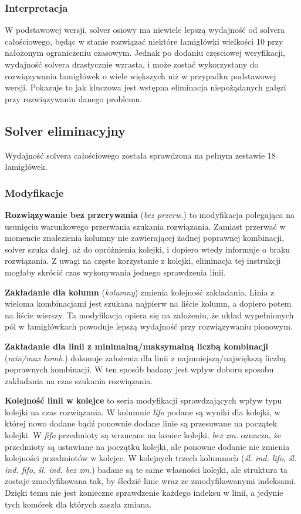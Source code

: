 \subsubsection{Interpretacja}
    W podstawowej wersji, solver osiowy ma niewiele lepszą wydajność od solvera całościowego,
będąc w stanie rozwiązać niektóre łamigłówki wielkości 10 przy nałożonym ograniczeniu czasowym. 
Jednak po dodaniu częsciowej weryfikacji, wydajność solvera drastycznie wzrasta, i może zostać
wykorzystany do rozwiązywania łamigłówek o wiele większych niż w przypadku podstawowej wersji.
Pokazuje to jak kluczowa jest wstępna eliminacja niepożądanych gałęzi przy rozwiązywaniu danego
problemu.


\subsection{Solver eliminacyjny}
    Wydajność solvera całościowego została sprawdzona na pełnym zestawie 18 łamigłówek.

\subsubsection{Modyfikacje}
    \textbf{Rozwiązywanie bez przerywania} (\textit{bez przerw.}) to modyfikacja polegająca na
usunięciu warunkowego przerwania szukania rozwiązania. Zamiast przerwać w momencie znalezienia
kolumny nie zawierającej żadnej poprawnej kombinacji, solver szuka dalej, aż do opróżnienia kolejki,
i dopiero wtedy informuje o braku rozwiązania. Z uwagi na częste korzystanie z kolejki, eliminacja
tej instrukcji mogłaby skrócić czas wykonywania jednego sprawdzenia linii.

    \textbf{Zakładanie dla kolumn} (\textit{kolumny}) zmienia kolejność zakładania. Linia z wieloma
kombinacjami jest szukana najpierw na liście kolumn, a dopiero potem na liście wierszy. Ta modyfikacja
opiera się na założeniu, że układ wypełnionych pól w łamigłówkach powoduje lepszą wydajność
przy rozwiązywaniu pionowym.

    \textbf{Zakładanie dla linii z minimalną/maksymalną liczbą kombinacji} (\textit{min/max komb.})
dokonuje założenia dla linii z najmniejszą/największą liczbą poprawnych kombinacji. W ten sposób
badany jest wpływ doboru sposobu zakładania na czas szukania rozwiązania.

    \textbf{Kolejność linii w kolejce} to seria modyfikacji sprawdzających wpływ typu kolejki
na czas rozwiązania. W kolumnie \textit{lifo} podane są wyniki dla kolejki, w której nowo dodane
bądź ponownie dodane linie są przesuwane na początek kolejki. W \textit{fifo} przedmioty są wrzucane
na koniec kolejki. \textit{bez zm.} oznacza, że przedmioty są ustawiane na początku kolejki, ale
ponowne dodanie nie zmienia kolejności przedmiotów w kolejce. W kolejnych trzech kolumnach
(\textit{śl. ind. lifo}, \textit{śl. ind. fifo}, \textit{śl. ind. bez zm.}) badane są te same
własności kolejki, ale struktura ta zostaje zmodyfikowana tak, by śledzić linie wraz ze zmodyfikowanymi
indeksami. Dzięki temu nie jest konieczne sprawdzenie każdego indeksu w linii, a jedynie tych komórek
dla których zaszła zmiana.


